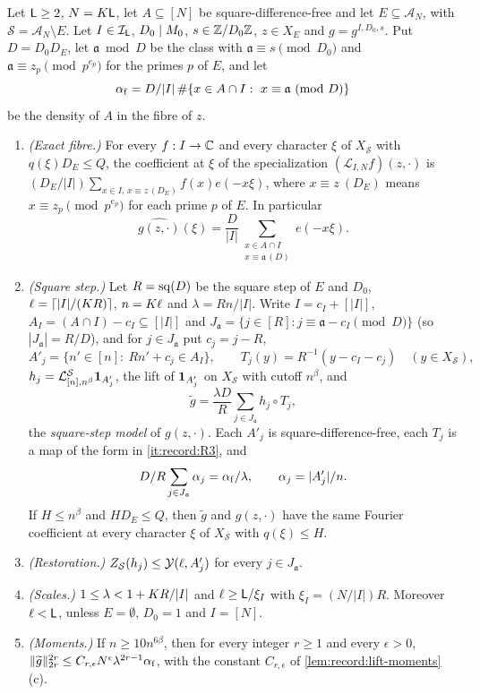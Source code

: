 \begin{lemma}
\label{lem:record:fibre-scale}
Let $\Lsc\ge2$, $N=\Kint\Lsc$, let $A\subseteq[N]$ be square-difference-free
and let $E\subseteq\mathcal A_N$, with $\mathcal S=\mathcal A_N\setminus E$.
Let $I\in\mathcal I_\Lsc$, $D_0\mid\Mzero$, $s\in\Z/D_0\Z$, $z\in X_E$ and
$g=g^{I,D_0,s}$. Put $D=D_0D_E$, let $\mathfrak a\bmod D$ be the class with
$\mathfrak a\equiv s\pmod{D_0}$ and $\mathfrak a\equiv z_p\pmod{p^{e_p}}$ for the primes $p$ of
$E$, and let
\[
 \alpha_{\rm f}=\frac D{|I|}\,\#\{x\in A\cap I:\ x\equiv\mathfrak a\ (\mathrm{mod}\ D)\}
\]
be the density of $A$ in the fibre of $z$.
\begin{enumerate}[label=(\alph*)]
\item \emph{(Exact fibre.)} For every $f:I\to\C$ and every character $\xi$ of
 $X_{\mathcal S}$ with $q(\xi)D_E\le Q$, the coefficient at $\xi$ of the
 specialization $(\mathcal L_{I,N}f)(z,\cdot)$ is
 $(D_E/|I|)\sum_{x\in I,\,x\equiv z\,(D_E)}f(x)e(-x\xi)$, where
 $x\equiv z\ (D_E)$ means $x\equiv z_p\pmod{p^{e_p}}$ for each prime $p$ of
 $E$. In particular
 \[
  \widehat{g(z,\cdot)}(\xi)=\frac D{|I|}\sum_{\substack{x\in A\cap I\\ x\equiv\mathfrak a\,(D)}}e(-x\xi).
 \]
\item \emph{(Square step.)} Let $R=\sq(D)$ be the square step of $E$ and
 $D_0$, $\ell=\lceil|I|/(\Kint R)\rceil$, $n=\Kint\ell$ and
 $\lambda=Rn/|I|$. Write $I=c_I+[|I|]$, $A_I=(A\cap I)-c_I\subseteq[|I|]$ and
 $J_{\mathfrak a}=\{j\in[R]:j\equiv\mathfrak a-c_I\pmod D\}$ (so $|J_{\mathfrak a}|=R/D$), and for $j\in J_{\mathfrak a}$
 put $c_j=j-R$,
 \[
  A'_j=\{n'\in[n]:\ Rn'+c_j\in A_I\},\qquad
  T_j(y)=R^{-1}(y-c_I-c_j)\quad(y\in X_{\mathcal S}),
 \]
 $h_j=\mathcal L^{\mathcal S}_{[n],n^\beta}\one_{A'_j}$, the lift of
 $\one_{A'_j}$ on $X_{\mathcal S}$ with cutoff $n^\beta$, and
 \[
  \widetilde g=\frac{\lambda D}{R}\sum_{j\in J_{\mathfrak a}}h_j\circ T_j ,
 \]
 the \emph{square-step model} of $g(z,\cdot)$. Each $A'_j$ is
 square-difference-free, each $T_j$ is a map of the form in
 \ref{it:record:R3}, and
 \[
  \frac DR\sum_{j\in J_{\mathfrak a}}\alpha_j=\frac{\alpha_{\rm f}}\lambda,\qquad
  \alpha_j=\frac{|A'_j|}n .
 \]
 If $H\le n^\beta$ and $HD_E\le Q$, then $\widetilde g$ and $g(z,\cdot)$
 have the same Fourier coefficient at every character $\xi$ of
 $X_{\mathcal S}$ with $q(\xi)\le H$.
\item \emph{(Restoration.)} $Z_{\mathcal S}(h_j)\le\Yf(\ell,A'_j)$ for every
 $j\in J_{\mathfrak a}$.
\item \emph{(Scales.)} $1\le\lambda<1+\Kint R/|I|$ and $\ell\ge\Lsc/\xi_I$
 with $\xi_I=(N/|I|)R$. Moreover $\ell<\Lsc$, unless $E=\emptyset$,
 $D_0=1$ and $I=[N]$.
\item \emph{(Moments.)} If $n\ge10n^{6\beta}$, then for every integer
 $r\ge1$ and every $\epsilon>0$,
 $\|\widetilde g\|_{2r}^{2r}\le C_{r,\epsilon}N^\epsilon\lambda^{2r-1}\alpha_{\rm f}$,
 with the constant $C_{r,\epsilon}$ of \cref{lem:record:lift-moments}(c).
\end{enumerate}
\end{lemma}

